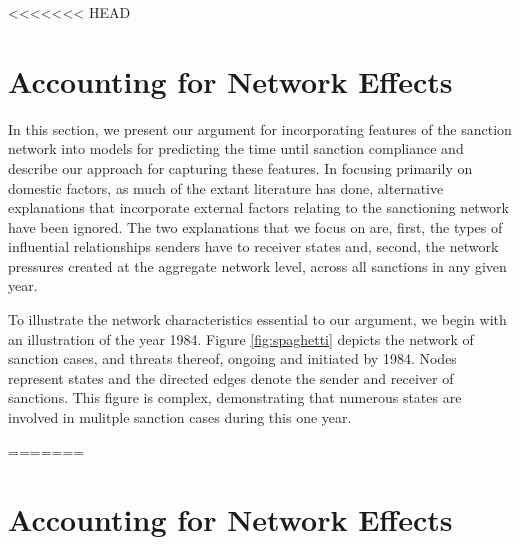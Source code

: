 <<<<<<< HEAD


\section*{Accounting for Network Effects}
\label{neteffects}

In this section, we present our argument for incorporating features of the sanction network into models for predicting the time until sanction compliance and describe our approach for capturing these features. In focusing primarily on domestic factors, as much of the extant literature has done, alternative explanations that incorporate external factors relating to the sanctioning network have been ignored. The two explanations that we focus on are, first, the types of influential relationships senders have to receiver states and, second, the network pressures created at the aggregate network level, across all sanctions in any given year. %

To illustrate the network characteristics essential to our argument, we begin with an illustration of the year 1984. Figure \ref{fig:spaghetti} depicts the network of sanction cases, and threats thereof, ongoing and initiated by 1984. Nodes represent states and the directed edges denote the sender and receiver of sanctions. This figure is complex, demonstrating that numerous states are involved in mulitple sanction cases during this one year.

=======
\section*{Accounting for Network Effects}
\label{neteffects}

